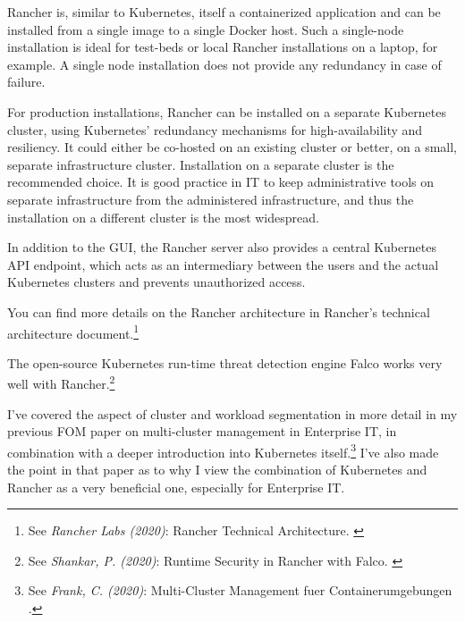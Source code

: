 Rancher is, similar to Kubernetes, itself a containerized application and can be installed from a single image to a single Docker host. Such a single-node installation is ideal for test-beds or local Rancher installations on a laptop, for example. A single node installation does not provide any redundancy in case of failure.

For production installations, Rancher can be installed on a separate Kubernetes cluster, using Kubernetes' redundancy mechanisms for high-availability and resiliency. It could either be co-hosted on an existing cluster or better, on a small, separate infrastructure cluster. Installation on a separate cluster is the recommended choice. It is good practice in IT to keep administrative tools on separate infrastructure from the administered infrastructure, and thus the installation on a different cluster is the most widespread.

In addition to the GUI, the Rancher server also provides a central Kubernetes API endpoint, which acts as an intermediary between the users and the actual Kubernetes clusters and prevents unauthorized access.

You can find more details on the Rancher architecture in Rancher's technical architecture document.\footnote{See \textit{Rancher Labs (2020)}: Rancher Technical Architecture. \cite{technicalArchitecture}}

The open-source Kubernetes run-time threat detection engine Falco works very well with Rancher.\footnote{See \textit{Shankar, P. (2020)}: Runtime Security in Rancher with Falco. \cite{falcoPsp}}

I've covered the aspect of cluster and workload segmentation in more detail in my previous FOM paper on multi-cluster management in Enterprise IT, in combination with a deeper introduction into Kubernetes itself.\footnote{See \textit{Frank, C. (2020)}: Multi-Cluster Management fuer Containerumgebungen .\cite{previousPaper}} I've also made the point in that paper as to why I view the combination of Kubernetes and Rancher as a very beneficial one, especially for Enterprise IT.

